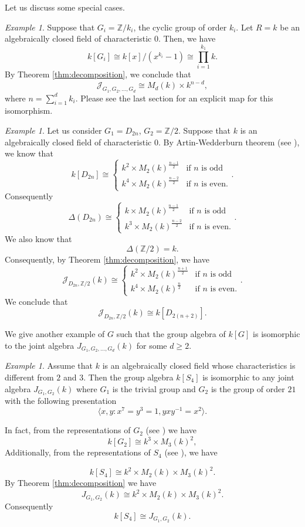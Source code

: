 \documentclass[12pt, a4paper]{amsart}
\numberwithin{equation}{section} %
\theoremstyle{plain}
\theoremstyle{definition}
\theoremstyle{plain}
\theoremstyle{remark}
\newtheorem{ex}[thm]{Example}
\newcommand{\Z}{\mathbb{Z}}
\newcommand{\sJ}{\mathcal{J}}
\begin{document}
Let us discuss some special cases.

\begin{ex} \label{ex:cyclic}
Suppose that $G_i=\Z/k_i$, the cyclic group of order $k_i.$ Let $R=k$ be an algebraically closed field of characteristic $0$. Then, we have 
\[ k[G_i] \cong k[x]/(x^{k_i}-1) \cong \prod_{i=1}^{k_1} k .\]
By Theorem \ref{thm:decomposition}, we conclude that 
\[ \sJ_{G_1, G_2, \ldots, G_d} \cong M_d(k) \times k^{n-d},\]
where $n =\sum_{i=1}^d k_i.$ Please see the last section for an explicit map for this isomorphism. 
\end{ex}

\begin{ex} \label{ex:join}
Let us consider $G_1=D_{2n}$,  $G_2= \Z/2$. Suppose that $k$ is an algebraically closed field of characteristic $0.$ By Artin-Wedderburn theorem (see \cite[Section 18.3]{james2001representations}), we know that 
\[ k[D_{2n}] \cong  \begin{cases}
  k^2 \times M_2(k)^{\frac{n-1}{2}}  & \text{if } n \text{ is odd} \\
  k^4 \times M_2(k)^{\frac{n-2}{2}} & \text{if } n \text{ is even}.
\end{cases} .\] 
Consequently 
\[ \Delta(D_{2n})\cong  \begin{cases}
  k \times M_2(k)^{\frac{n-1}{2}}  & \text{if } n \text{ is odd} \\
  k^3 \times M_2(k)^{\frac{n-2}{2}} & \text{if } n \text{ is even}.
\end{cases} .\] 
We also know that 
\[ \Delta(\Z/2)= k .\] 
Consequently, by Theorem \ref{thm:decomposition}, we have 
\[ \sJ_{D_{2n}, \Z/2}(k)  \cong  \begin{cases}
  k^2 \times M_2(k)^{\frac{n+1}{2}}  & \text{if } n \text{ is odd} \\
  k^4 \times M_2(k)^{\frac{n}{2}} & \text{if } n \text{ is even}. 
\end{cases} .\] 
We conclude that 
\[ \sJ_{D_{2n}, \Z/2}(k) \cong k[D_{2(n+2)}] .\] 
\end{ex}
We give another example of $G$ such that the group algebra of  $k[G]$ is isomorphic to the joint algebra $J_{G_1, G_2, \ldots, G_d}(k)$ for some $d \geq 2.$ 
\begin{ex} 
Assume that $k$ is an algebraically closed field whose characteristics is different from $2$ and $3$. Then the group algebra $k[S_4]$ is isomorphic to any joint algebra $J_{G_1, G_2}(k)$ where $G_1$ is the trivial group and $G_2$ is the group of order $21$ with the following presentation 
\[ \langle x,y: x^7=y^3=1, yxy^{-1}=x^2 \rangle .\] 

In fact, from the representations of $G_2$ (see \cite[Theorem 25.10]{james2001representations}) we have 
\[ k[G_2] \cong k^{3} \times M_3(k)^2 ,\] 
Additionally, from the representations of $S_4$ (see \cite[Example 16.3]{james2001representations}), we have 

\[ k[S_4] \cong k^2 \times M_2(k) \times M_3(k)^2 .\] 
By Theorem \ref{thm:decomposition} we have 
\[ J_{G_1, G_2}(k) \cong k^2 \times M_2(k) \times M_3(k)^2 .\]
Consequently 
\[ k[S_4] \cong J_{G_1, G_2}(k) .\]
\end{ex}
\end{document}
